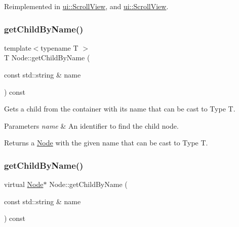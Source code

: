 Reimplemented in \hyperlink{classui_1_1ScrollView_ab61ab552b7ea1fb1ebff43f34441a876}{ui\+::\+Scroll\+View}, and \hyperlink{classui_1_1ScrollView_a9750342974b85647eac63dc49db4292f}{ui\+::\+Scroll\+View}.

\mbox{\label{classNode_abbd6d0f2c3d65db94ea75d16402f83a2}} 
\subsubsection{\texorpdfstring{get\+Child\+By\+Name()}{getChildByName()}\hspace{0.1cm}{\footnotesize\ttfamily [2/4]}}
{\footnotesize\ttfamily template$<$typename T $>$ \\
T Node\+::get\+Child\+By\+Name (\begin{DoxyParamCaption}\item[{const std\+::string \&}]{name }\end{DoxyParamCaption}) const\hspace{0.3cm}{\ttfamily [inline]}}

Gets a child from the container with its name that can be cast to Type T.


\begin{DoxyParams}{Parameters}
{\em name} & An identifier to find the child node.\\
\hline
\end{DoxyParams}
\begin{DoxyReturn}{Returns}
a \hyperlink{classNode}{Node} with the given name that can be cast to Type T. 
\end{DoxyReturn}
\mbox{\label{classNode_af00de78a02fd2112123857bbe053e163}} 
\subsubsection{\texorpdfstring{get\+Child\+By\+Name()}{getChildByName()}\hspace{0.1cm}{\footnotesize\ttfamily [3/4]}}
{\footnotesize\ttfamily virtual \hyperlink{classNode}{Node}$\ast$ Node\+::get\+Child\+By\+Name (\begin{DoxyParamCaption}\item[{const std\+::string \&}]{name }\end{DoxyParamCaption}) const\hspace{0.3cm}{\ttfamily [virtual]}}

